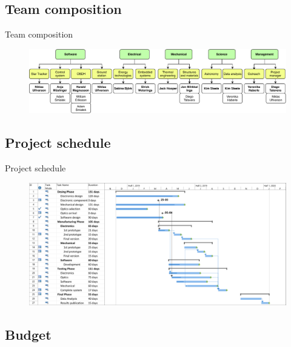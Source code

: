 \documentclass[11pt, aspectratio=169]{beamer}
\begin{document}
\subsection{Team composition}
\begin{frame}[c]{Team composition}
    \begin{figure}
        \includegraphics[width=\linewidth]{images/Team_structure.pdf}
    \end{figure}
\end{frame}

\subsection{Project schedule}
\begin{frame}{Project schedule}
    \begin{figure}
        \vspace{-.1cm}
        \includegraphics[height=0.9\textheight]{images/gantt.png}
    \end{figure}
\end{frame}

\subsection{Budget}
\end{document}
